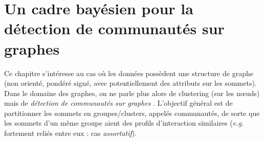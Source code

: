 \chapter{Un cadre bayésien pour la détection de communautés sur graphes}
\label{chap:bayes_clusters_graphes}



\usetikzlibrary{fit,backgrounds,shapes.geometric,patterns,decorations.pathreplacing}


\newcommand{\ChapTriangleIcon}[2][1.65ex]{%
  \begingroup
  \pgfmathsetlengthmacro{\TriangleH}{#1}%
  \tikz[
    baseline=-0.25ex,
    x=\TriangleH,
    y=\TriangleH,
    line cap=round,
    line join=round
  ]{%
    \path[use as bounding box]
      (-0.08,-0.12) rectangle (1.24,1.12);

    \draw[#2]
      (0,0)
      --
      (1.1547,0)
      --
      (0.57735,1)
      --
      cycle;
  }%
  \endgroup
}

\DeclareRobustCommand{\TriangleAttractif}[1][2.5ex]{%
  \ChapTriangleIcon[#1]{posedge}%
}

\DeclareRobustCommand{\TriangleRepulsif}[1][2.5ex]{%
  \ChapTriangleIcon[#1]{negedge}%
}


Ce chapitre s'intéresse au cas où les données possèdent une structure de graphe (non orienté, pondéré signé, avec potentiellement des attributs sur les sommets). 
Dans le domaine des graphes, on ne parle plus alors de clustering (sur les nœuds) mais de \emph{détection de communautés sur graphes} \cite{Fortunato2010}. L'objectif général est de partitionner les sommets en groupes/clusters, appelés communautés, de sorte que les sommets d'un même groupe aient des profils d'interaction similaires (\emph{e.g.} fortement reliés entre eux : cas \emph{assortatif}).

